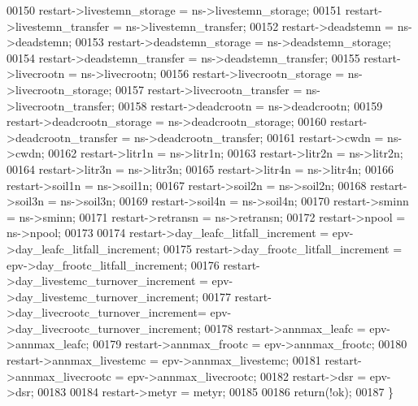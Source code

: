 \begin{DoxyCode}
00150     restart->livestemn\_storage                = ns->livestemn\_storage;
00151     restart->livestemn\_transfer               = ns->livestemn\_transfer;
00152     restart->deadstemn                        = ns->deadstemn;
00153     restart->deadstemn\_storage                = ns->deadstemn\_storage;
00154     restart->deadstemn\_transfer               = ns->deadstemn\_transfer;
00155     restart->livecrootn                       = ns->livecrootn;
00156     restart->livecrootn\_storage               = ns->livecrootn\_storage;
00157     restart->livecrootn\_transfer              = ns->livecrootn\_transfer;
00158     restart->deadcrootn                       = ns->deadcrootn;
00159     restart->deadcrootn\_storage               = ns->deadcrootn\_storage;
00160     restart->deadcrootn\_transfer              = ns->deadcrootn\_transfer;
00161     restart->cwdn                             = ns->cwdn;
00162     restart->litr1n                           = ns->litr1n;
00163     restart->litr2n                           = ns->litr2n;
00164     restart->litr3n                           = ns->litr3n;
00165     restart->litr4n                           = ns->litr4n;
00166     restart->soil1n                           = ns->soil1n;
00167     restart->soil2n                           = ns->soil2n;
00168     restart->soil3n                           = ns->soil3n;
00169     restart->soil4n                           = ns->soil4n;
00170     restart->sminn                            = ns->sminn;
00171     restart->retransn                         = ns->retransn;
00172     restart->npool                            = ns->npool;
00173 
00174     restart->day\_leafc\_litfall\_increment      = epv->day\_leafc\_litfall\_increment;
00175     restart->day\_frootc\_litfall\_increment     = epv->day\_frootc\_litfall\_increment;
00176     restart->day\_livestemc\_turnover\_increment = epv->day\_livestemc\_turnover\_increment;
00177     restart->day\_livecrootc\_turnover\_increment= epv->day\_livecrootc\_turnover\_increment;
00178     restart->annmax\_leafc                     = epv->annmax\_leafc;
00179     restart->annmax\_frootc                    = epv->annmax\_frootc;
00180     restart->annmax\_livestemc                 = epv->annmax\_livestemc;
00181     restart->annmax\_livecrootc                = epv->annmax\_livecrootc;
00182     restart->dsr                              = epv->dsr;
00183 
00184     restart->metyr                            = metyr;
00185     
00186     \textcolor{keywordflow}{return}(!ok);
00187 \}
\end{DoxyCode}
